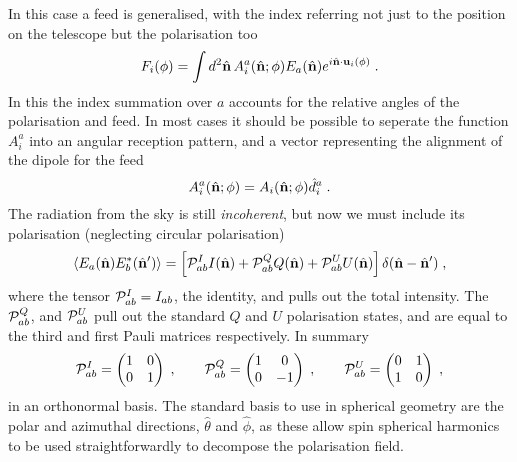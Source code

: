 \documentclass{revtex4}
\begin{document}
In this case a feed is generalised, with the index referring not just to the
position on the telescope but the polarisation too
\begin{equation}
  F_i(\phi) = \int d^2\hat{\mathbf{n}} \, A^a_i(\hat{\mathbf{n}}; \phi) E_a(\hat{\mathbf{n}}) e^{i
    \hat{\mathbf{n}}\cdot\mathbf{u}_i(\phi)}\; .
\end{equation}
In this the index summation over $a$ accounts for the relative angles of the
polarisation and feed. In most cases it should be possible to seperate the
function $A_i^a$ into an angular reception pattern, and a vector representing
the alignment of the dipole for the feed
\begin{equation}
  A_i^a(\hat{\mathbf{n}}; \phi) = A_i(\hat{\mathbf{n}}; \phi) \hat{d}^a_i \; .
\end{equation}
The radiation from the sky is still \emph{incoherent}, but now we must include
its polarisation (neglecting circular polarisation)
\begin{equation}
  \left\langle E_a(\hat{\mathbf{n}}) E_b^* (\hat{\mathbf{n}}') \right\rangle = \left[\mathcal{P}_{ab}^I
    I(\hat{\mathbf{n}}) + \mathcal{P}_{ab}^Q Q(\hat{\mathbf{n}}) + \mathcal{P}_{ab}^U U(\hat{\mathbf{n}})\right]\delta(\hat{\mathbf{n}} - \hat{\mathbf{n}}') \; ,
\end{equation}
where the tensor $\mathcal{P}^I_{ab} = I_{ab}$, the identity, and pulls out the total
intensity. The $\mathcal{P}^Q_{ab}$, and $\mathcal{P}^U_{ab}$ pull out the standard $Q$ and
$U$ polarisation states, and are equal to the third and first Pauli matrices
respectively. In summary
\begin{equation}
\mathcal{P}^I_{ab} = \begin{pmatrix} 1 & 0 \\ 0 & 1\end{pmatrix} \; ,
\qquad
\mathcal{P}^Q_{ab} = \begin{pmatrix} 1 & 0 \\ 0 & -1\end{pmatrix} \; ,
\qquad
\mathcal{P}^U_{ab} = \begin{pmatrix} 0 & 1 \\ 1 & 0\end{pmatrix} \; ,
\end{equation}
in an orthonormal basis. The standard basis to use in spherical geometry are the
polar and azimuthal directions, $\hat{\theta}$ and $\hat{\phi}$, as these allow
spin spherical harmonics to be used straightforwardly to decompose the
polarisation field.
\end{document}
